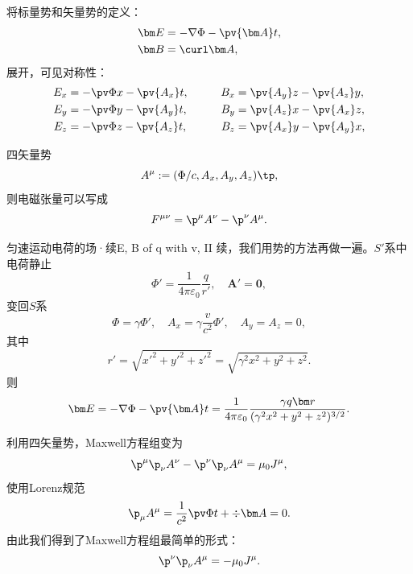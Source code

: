 将标量势和矢量势的定义：
\begin{align*}
    \bm E&=-\nabla\Phi-\pv{\bm A}t,\\
    \bm B&=\curl\bm A,
\end{align*}
展开，可见对称性：
\begin{alignat*}{2}
    E_x&=-\pv\Phi x-\pv{A_x}t,&\qquad B_x&=\pv{A_y}z-\pv{A_z}y,\\
    E_y&=-\pv\Phi y-\pv{A_y}t,&B_y&=\pv{A_z}x-\pv{A_x}z,\\
    E_z&=-\pv\Phi z-\pv{A_z}t,&B_z&=\pv{A_x}y-\pv{A_y}x,
\end{alignat*}

四矢量势
\begin{equation}
    A^\mu:=(\Phi/c,A_x,A_y,A_z)\tp,
\end{equation}
则电磁张量可以写成
\begin{equation}
    F^{\mu\nu}=\p^\mu A^\nu-\p^\nu A^\mu.
\end{equation}
\begin{example}{匀速运动电荷的场·续}{E, B of q with v, II}
    续，我们用势的方法再做一遍。$S'$系中电荷静止 
    \[
        \Phi'=\frac1{4\pi\varepsilon_0}\frac q{r'},\quad\bm A'=\bm 0,
    \]
    变回$S$系
    \[
        \Phi=\gamma\Phi',\quad A_x=\gamma\frac v{c^2}\Phi',\quad A_y=A_z=0,
    \]
    其中 
    \[
        r'=\sqrt{x'^2+y'^2+z'^2}=\sqrt{\gamma^2x^2+y^2+z^2}.
    \]
    则
    \[
        \bm E=-\nabla\Phi-\pv{\bm A}t=\frac1{4\pi\varepsilon_0}\frac{\gamma q\bm r}{(\gamma^2x^2+y^2+z^2)^{3/2}}.
    \]
\end{example}
利用四矢量势，Maxwell方程组变为
\[
    \p^\mu\p_\nu A^\nu-\p^\nu\p_\nu A^\mu=\mu_0J^\mu,
\]
使用Lorenz规范
\[
    \p_\mu A^\mu=\frac1{c^2}\pv\Phi t+\div\bm A=0.
\]
由此我们得到了Maxwell方程组最简单的形式：
\begin{equation}
    \p^\nu\p_\nu A^\mu=-\mu_0J^\mu.
\end{equation}
